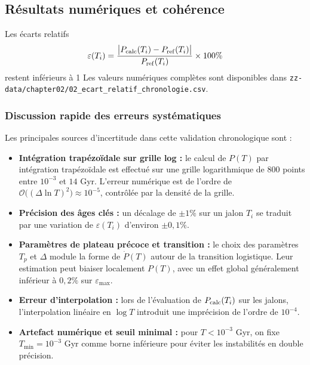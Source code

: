 \subsection{Résultats numériques et cohérence}

Les écarts relatifs
\[
  \varepsilon(T_{i})
  = \frac{\bigl|P_{\rm calc}(T_{i}) - P_{\rm ref}(T_{i})\bigr|}
         {P_{\rm ref}(T_{i})}\times100\%
\]
restent inférieurs à 1 %
Les valeurs numériques complètes sont disponibles dans
\texttt{zz-data/chapter02/02\_ecart\_relatif\_chronologie.csv}.

\subsubsection*{Discussion rapide des erreurs systématiques}

Les principales sources d’incertitude dans cette validation chronologique sont :

\begin{itemize}
  \item \textbf{Intégration trapézoïdale sur grille log :}
    le calcul de \(P(T)\) par intégration trapézoïdale est effectué sur une grille logarithmique de 800 points entre \(10^{-3}\) et \(14\) Gyr.
    L’erreur numérique est de l’ordre de \(\mathcal{O}\bigl((\Delta \ln T)^2\bigr)\approx10^{-5}\), contrôlée par la densité de la grille.

  \item \textbf{Précision des âges clés :}
    un décalage de \(\pm1\%\) sur un jalon \(T_i\) se traduit par une variation de \(\varepsilon(T_i)\) d’environ \(\pm0{,}1\%\).

  \item \textbf{Paramètres de plateau précoce et transition :}
    le choix des paramètres \(T_{p}\) et \(\Delta\) module la forme de \(\dot P(T)\) autour de la transition logistique.
    Leur estimation peut biaiser localement \(P(T)\), avec un effet global généralement inférieur à \(0{,}2\%\) sur \(\varepsilon_{\max}\).

  \item \textbf{Erreur d’interpolation :}
    lors de l’évaluation de \(P_{\rm calc}(T_i)\) sur les jalons, l’interpolation linéaire en \(\log T\) introduit une imprécision de l’ordre de \(10^{-4}\).

  \item \textbf{Artefact numérique et seuil minimal :}
    pour \(T<10^{-3}\) Gyr, on fixe \(T_{\min}=10^{-3}\) Gyr comme borne inférieure pour éviter les instabilités en double précision.
\end{itemize}

